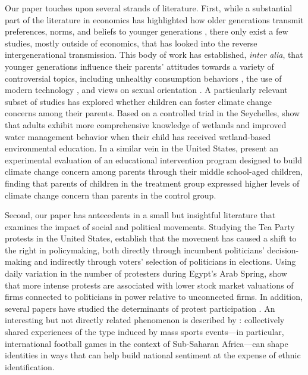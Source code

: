 Our paper touches upon several strands of literature. First, while a substantial part of the literature in economics has highlighted how older generations transmit preferences, norms, and beliefs to younger generations \citep{bisin2001economics,fernandez2004mothers,fernandez2009culture,figlio2019longterm}, there only exist a few studies, mostly outside of economics, that has looked into the reverse intergenerational transmission. This body of work has established, \emph{inter alia}, that younger generations influence their parents' attitudes towards a variety of controversial topics, including unhealthy consumption behaviors \citep{flurry2005children}, the use of modern technology \citep{baily2009reverse}, and views on sexual orientation \citep{lasala2000lesbians}. A particularly relevant subset of studies has explored whether children can foster climate change concerns among their parents. Based on a controlled trial in the Seychelles, \citet{damerell2013child} show that adults exhibit more comprehensive knowledge of wetlands and improved water management behavior when their child has received wetland-based environmental education. In a similar vein in the United States, \citet{lawson2019children} present an experimental evaluation of an educational intervention program designed to build climate change concern among parents through their middle school-aged children, finding that parents of children in the treatment group expressed higher levels of climate change concern than parents in the control group. 


Second, our paper has antecedents in a small but insightful literature that examines the impact of social and political movements. Studying the Tea Party protests in the United States, \citet{madestam2013political} establish that the movement has caused a shift to the right in policymaking, both directly through incumbent politicians' decision-making and indirectly through voters' selection of politicians in elections. Using daily variation in the number of protesters during Egypt's Arab Spring, \citet{acemoglu2018power} show that more intense protests are associated with lower stock market valuations of firms connected to politicians in power relative to unconnected firms. In addition, several papers have studied the determinants of protest participation \citep{finkel1991party,finkel1998rational,cantoni2019protests,bursztyn2020persistent}. An interesting but not directly related phenomenon is described by \citet{depetris2020building}: collectively shared experiences of the type induced by mass sports events---in particular, international football games in the context of Sub-Saharan Africa---can shape identities in ways that can help build national sentiment at the expense of ethnic identification.


